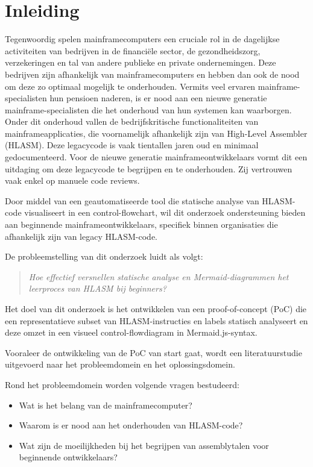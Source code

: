 
\section{Inleiding}%
\label{sec:inleiding}
Tegenwoordig spelen mainframecomputers een cruciale rol in de dagelijkse activiteiten van bedrijven in de financiële sector, de gezondheidszorg, verzekeringen en tal van andere publieke en private ondernemingen. Deze bedrijven zijn afhankelijk van mainframecomputers en hebben dan ook de nood om deze zo optimaal mogelijk te onderhouden. Vermits veel ervaren mainframe-specialisten hun pensioen naderen, is er nood aan een nieuwe generatie mainframe-specialisten die het onderhoud van hun systemen kan waarborgen. Onder dit onderhoud vallen de bedrijfskritische functionaliteiten van mainframeapplicaties, die voornamelijk afhankelijk zijn van High-Level Assembler (HLASM). Deze legacycode is vaak tientallen jaren oud en minimaal gedocumenteerd. Voor de nieuwe generatie mainframeontwikkelaars vormt dit een uitdaging om deze legacycode te begrijpen en te onderhouden. Zij vertrouwen vaak enkel op manuele code reviews.

Door middel van een geautomatiseerde tool die statische analyse van HLASM-code visualiseert in een control-flowchart, wil dit onderzoek ondersteuning bieden aan beginnende mainframeontwikkelaars, specifiek binnen organisaties die afhankelijk zijn van legacy HLASM-code.

De probleemstelling van dit onderzoek luidt als volgt:
\begin{quote}
    \itshape
    Hoe effectief versnellen statische analyse en Mermaid-diagrammen het leerproces van HLASM bij beginners?
\end{quote}

Het doel van dit onderzoek is het ontwikkelen van een proof-of-concept (PoC) die een representatieve subset van HLASM-instructies en labels statisch analyseert en deze omzet in een visueel control-flowdiagram in Mermaid.js-syntax.

Vooraleer de ontwikkeling van de PoC van start gaat, wordt een literatuurstudie uitgevoerd naar het probleemdomein en het oplossingsdomein.

Rond het probleemdomein worden volgende vragen bestudeerd:
\begin{itemize}
    \item Wat is het belang van de mainframecomputer?
    \item Waarom is er nood aan het onderhouden van HLASM-code?
    \item Wat zijn de moeilijkheden bij het begrijpen van assemblytalen voor beginnende ontwikkelaars?
\end{itemize}

